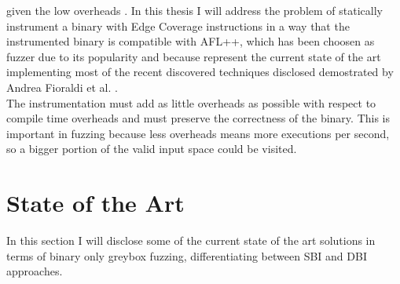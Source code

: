     given the low overheads \cite{zafl}.
    In this thesis I will address the problem 
    of statically instrument a binary with Edge Coverage instructions in a way that the instrumented binary is compatible with AFL++,  
    which  has been choosen as fuzzer due to its popularity and because represent the current state of the art implementing 
    most of the recent discovered techniques disclosed demostrated by Andrea Fioraldi et al. \cite{aflplusplus}.\\
    The instrumentation must add as little overheads as possible with respect to compile time overheads and must 
    preserve the correctness of the binary. This is important in fuzzing because less overheads means more executions per second, 
    so a bigger portion of the valid input space could be visited.
   
    \section{State of the Art}\label{sec:state_of_the_art}
        In this section I will disclose some of the current state of the art solutions in terms of binary only greybox fuzzing, 
        differentiating between \gls{SBI} and \gls{DBI} approaches.
        
